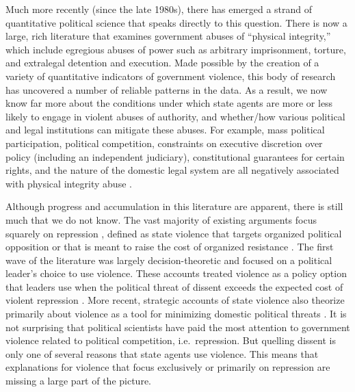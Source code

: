 \documentclass[12pt]{article}
\begin{document}
Much more recently (since the late 1980s), there has emerged a strand of quantitative political science that speaks directly to this question. There is now a large, rich literature that examines government abuses of ``physical integrity,'' which include egregious abuses of power such as arbitrary imprisonment, torture, and extralegal detention and execution. Made possible by the creation of a variety of quantitative indicators of government violence, this body of research has uncovered a number of reliable patterns in the data. As a result, we now know far more about the conditions under which state agents are more or less likely to engage in violent abuses of authority, and whether/how various political and legal institutions can mitigate these abuses. For example, mass political participation, political competition, constraints on executive discretion over policy (including an independent judiciary), constitutional guarantees for certain rights, and the nature of the domestic legal system are all negatively associated with physical integrity abuse \citep[E.g.,][]{PoeTate1994,Davenport1996,Poeetal1999,BdMetal2005,Davenport2007,KeithTatePoe2009,Mitchell2013,HillJones2014}.   

Although progress and accumulation in this literature are apparent, there is still much that we do not know. The vast majority of existing arguments focus squarely on repression \citep{Haschke2011}, defined as state violence that targets organized political opposition or that is meant to raise the cost of organized resistance \citep{Bisselletal1978,Tilly1978, Goldstein1978, StohlLopez1984,Davenport2007AR}. The first wave of the literature was largely decision-theoretic and focused on a political leader's choice to use violence. These accounts treated violence as a policy option that leaders use when the political threat of dissent exceeds the expected cost of violent repression \citep{Davenport1995,Poe2004}. More recent, strategic accounts of state violence also theorize primarily about violence as a tool for minimizing domestic political threats \citep{Pierskalla2010,Ritter2014,RitterConrad2016}. 
It is not surprising that political scientists have paid the most attention to government violence related to political competition, i.e.\ repression. But quelling dissent is only one of several reasons that state agents use violence. This means that explanations for violence that focus exclusively or primarily on repression are missing a large part of the picture. 
\end{document}
